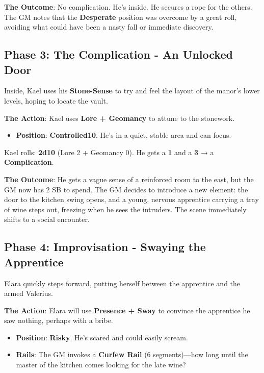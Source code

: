 \textbf{The Outcome}: No complication. He's inside. He secures a rope for the others. The GM notes that the \textbf{Desperate} position was overcome by a great roll, avoiding what could have been a nasty fall or immediate discovery.

\subsection*{Phase 3: The Complication - An Unlocked Door}

Inside, Kael uses his \textbf{Stone-Sense} to try and feel the layout of the manor's lower levels, hoping to locate the vault.

\textbf{The Action}: Kael uses \textbf{Lore + Geomancy} to attune to the stonework.

\begin{itemize}
    \item \textbf{Position}: \textbf{Controlled10}. He's in a quiet, stable area and can focus.
\end{itemize}

Kael rolls: \textbf{2d10} (Lore 2 + Geomancy 0). He gets a \textbf{1} and a \textbf{3} → a \textbf{Complication}.

\textbf{The Outcome}: He gets a vague sense of a reinforced room to the east, but the GM now has 2 SB to spend. The GM decides to introduce a new element: the door to the kitchen swing opens, and a young, nervous apprentice carrying a tray of wine steps out, freezing when he sees the intruders. The scene immediately shifts to a social encounter.

\subsection*{Phase 4: Improvisation - Swaying the Apprentice}

Elara quickly steps forward, putting herself between the apprentice and the armed Valerius.

\textbf{The Action}: Elara will use \textbf{Presence + Sway} to convince the apprentice he saw nothing, perhaps with a bribe.

\begin{itemize}
    \item \textbf{Position}: \textbf{Risky}. He's scared and could easily scream.
    \item \textbf{Rails}: The GM invokes a \textbf{Curfew Rail} (6 segments)---how long until the master of the kitchen comes looking for the late wine?
\end{itemize}

